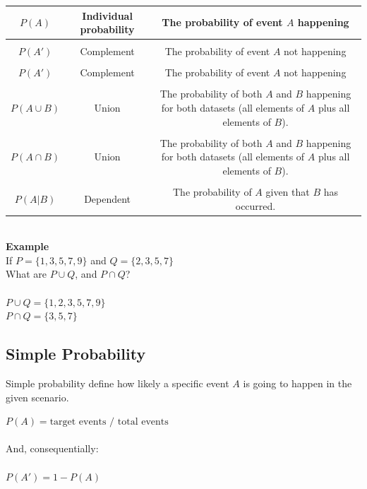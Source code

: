 \documentclass{article}
\begin{document}
\begin{center}
\begin{tabular}{|c|c|c|}
\hline
$P(A)$ & Individual probability & The probability of event $A$ happening \\ \hline
&&\\[-1em]
$P(A')$ & Complement & The probability of event $A$ not happening \\ \hline
&&\\[-1em]
$P(A')$ & Complement & The probability of event $A$ not happening \\ \hline
&&\\[-1em]
$P(A \cup B)$ & Union & \makecell{The probability of both $A$ and $B$ happening for both datasets \\ (all elements of $A$ plus all elements of $B$).} \\ \hline
&&\\[-1em]
$P(A \cap B)$ & Union & \makecell{The probability of both $A$ and $B$ happening for both datasets \\ (all elements of $A$ plus all elements of $B$).} \\ \hline
&&\\[-1em]
$P(A | B)$ & Dependent & The probability of $A$ given that $B$ has occurred. \\
\hline
\end{tabular}
\end{center}

\mbox{} \\

\textbf{Example}\\ 
If $P = \{1,3,5,7,9\}$ and $Q = \{2,3,5,7\}$ \\
What are $P \cup Q$, and $P \cap  Q$? \\ 
\mbox{} \\
$P \cup Q = \{1,2,3,5,7,9\}$ \\ 
$P \cap Q = \{3,5,7\}$ \\

\subsection{Simple Probability}
Simple probability define how likely a specific event $A$ is going to happen in the given scenario. 

$P(A) = \text{target events / total events}$ \\
\mbox{} \\
And, consequentially: \\
\mbox{} \\
$P(A') = 1 - P(A)$
\end{document}
